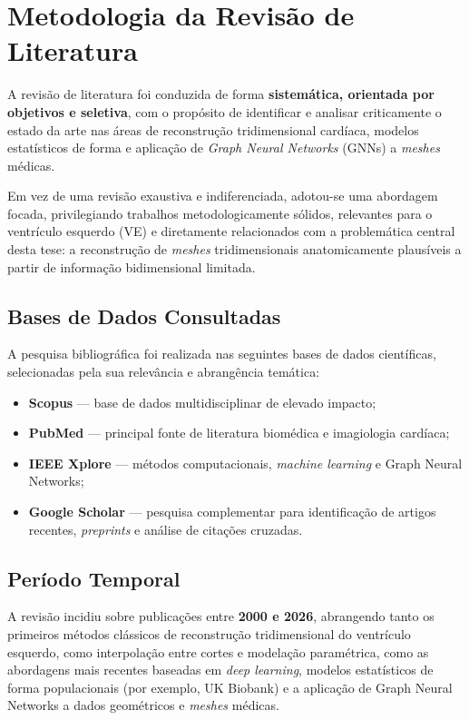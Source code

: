 \documentclass[12pt,a4paper]{report}
\begin{document}
\chapter{Metodologia da Revisão de Literatura}

A revisão de literatura foi conduzida de forma \textbf{sistemática, orientada por objetivos e seletiva}, com o propósito de identificar e analisar criticamente o estado da arte nas áreas de reconstrução tridimensional cardíaca, modelos estatísticos de forma e aplicação de \textit{Graph Neural Networks} (GNNs) a \textit{meshes} médicas.

Em vez de uma revisão exaustiva e indiferenciada, adotou-se uma abordagem focada, privilegiando trabalhos metodologicamente sólidos, relevantes para o ventrículo esquerdo (VE) e diretamente relacionados com a problemática central desta tese: a reconstrução de \textit{meshes} tridimensionais anatomicamente plausíveis a partir de informação bidimensional limitada.

\section{Bases de Dados Consultadas}

A pesquisa bibliográfica foi realizada nas seguintes bases de dados científicas, selecionadas pela sua relevância e abrangência temática:

\begin{itemize}
    \item \textbf{Scopus} — base de dados multidisciplinar de elevado impacto;
    \item \textbf{PubMed} — principal fonte de literatura biomédica e imagiologia cardíaca;
    \item \textbf{IEEE Xplore} — métodos computacionais, \textit{machine learning} e Graph Neural Networks;
    \item \textbf{Google Scholar} — pesquisa complementar para identificação de artigos recentes, \textit{preprints} e análise de citações cruzadas.
\end{itemize}

\section{Período Temporal}

A revisão incidiu sobre publicações entre \textbf{2000 e 2026}, abrangendo tanto os primeiros métodos clássicos de reconstrução tridimensional do ventrículo esquerdo, como interpolação entre cortes e modelação paramétrica, como as abordagens mais recentes baseadas em \textit{deep learning}, modelos estatísticos de forma populacionais (por exemplo, UK Biobank) e a aplicação de Graph Neural Networks a dados geométricos e \textit{meshes} médicas.
\end{document}
